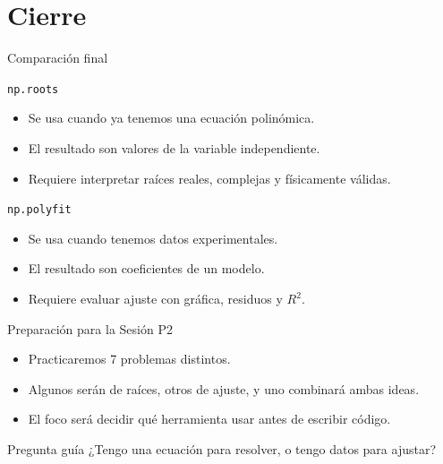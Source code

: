 \documentclass[10pt]{beamer}
\begin{document}
\section{Cierre}

\begin{frame}{Comparación final}
  \begin{block}{\texttt{np.roots}}
    \begin{itemize}
      \item Se usa cuando ya tenemos una ecuación polinómica.
      \item El resultado son valores de la variable independiente.
      \item Requiere interpretar raíces reales, complejas y físicamente válidas.
    \end{itemize}
  \end{block}

  \begin{block}{\texttt{np.polyfit}}
    \begin{itemize}
      \item Se usa cuando tenemos datos experimentales.
      \item El resultado son coeficientes de un modelo.
      \item Requiere evaluar ajuste con gráfica, residuos y \(R^2\).
    \end{itemize}
  \end{block}
\end{frame}

\begin{frame}{Preparación para la Sesión P2}
  \begin{itemize}
    \item Practicaremos 7 problemas distintos.
    \item Algunos serán de raíces, otros de ajuste, y uno combinará ambas ideas.
    \item El foco será decidir qué herramienta usar antes de escribir código.
  \end{itemize}

  \begin{alertblock}{Pregunta guía}
    ¿Tengo una ecuación para resolver, o tengo datos para ajustar?
  \end{alertblock}
\end{frame}
\end{document}
